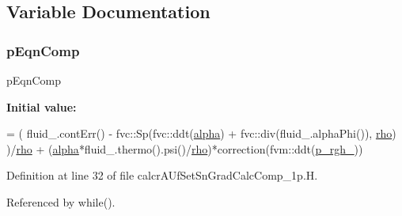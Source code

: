 \subsection{Variable Documentation}
\mbox{\label{calcrAUfSetSnGradCalcComp__1p_8H_a1957c1a38ccd80df5953c7543dc31182}} 
\subsubsection{\texorpdfstring{p\+Eqn\+Comp}{pEqnComp}}
{\footnotesize\ttfamily p\+Eqn\+Comp}

{\bfseries Initial value\+:}
\begin{DoxyCode}
=
        (
            fluid\_.contErr() 
          - fvc::Sp(fvc::ddt(\hyperlink{UEqn__1p_8H_a7fe02434a19f3e00e927f32adcbb193b}{alpha}) + fvc::div(fluid\_.alphaPhi()), \hyperlink{updatePP__rghRho__1p_8H_ab8ec92cc3ea8422c9349409bae98d2a0}{rho})
        )/\hyperlink{updatePP__rghRho__1p_8H_ab8ec92cc3ea8422c9349409bae98d2a0}{rho}
    +   (\hyperlink{UEqn__1p_8H_a7fe02434a19f3e00e927f32adcbb193b}{alpha}*fluid\_.thermo().psi()/\hyperlink{updatePP__rghRho__1p_8H_ab8ec92cc3ea8422c9349409bae98d2a0}{rho})*correction(fvm::ddt(\hyperlink{updatePP__rghRho__1p_8H_a320090d1a3c1675778a59e981765c77c}{p\_rgh\_}))
\end{DoxyCode}


Definition at line 32 of file calcr\+A\+Uf\+Set\+Sn\+Grad\+Calc\+Comp\+\_\+1p.\+H.



Referenced by while().

